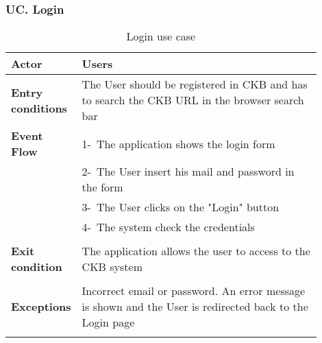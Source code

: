 \subsubsection*{UC\cuc . Login}
\begin{center}
    \begin{longtable}{|l|p{0.9\linewidth}|}
        \hline
        \textbf{Actor}            & Users                                                                                                                                                                                        \\
        \hline
        \textbf{Entry conditions} & The User should be registered in CKB and has to search the CKB URL in the browser search bar                                                                                                                   \\
        \hline
        \textbf{Event Flow}       & 1-\ The application shows the login form                                                     \\
        & 2-\ The User insert his mail and password in the form \\
        & 3-\ The User clicks on the "Login" button       \\                                                                                                                      
        & 4-\ The system check the credentials  \\                                                                                                                                                                                                                                     \\
        \hline
        \textbf{Exit condition}   & The application allows the user to access to the CKB system \\                                                                                                                                                                                \\
        \hline
        \textbf{Exceptions}       & Incorrect email or password. An error message is shown and the User is redirected back to the Login page                                                                                                                        \\
        \hline
        \caption{Login use case}
        \label{tab: login_use_case}
    \end{longtable}
\end{center}

